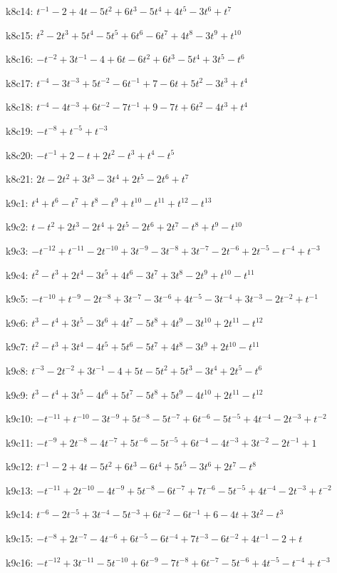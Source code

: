 k8c14: $t^{-1}-2+4t-5t^{2}+6t^{3}-5t^{4}+4t^{5}-3t^{6}+t^{7}$

k8c15: $t^{2}-2t^{3}+5t^{4}-5t^{5}+6t^{6}-6t^{7}+4t^{8}-3t^{9}+t^{10}$

k8c16: $-t^{-2}+3t^{-1}-4+6t-6t^{2}+6t^{3}-5t^{4}+3t^{5}-t^{6}$

k8c17: $t^{-4}-3t^{-3}+5t^{-2}-6t^{-1}+7-6t+5t^{2}-3t^{3}+t^{4}$

k8c18: $t^{-4}-4t^{-3}+6t^{-2}-7t^{-1}+9-7t+6t^{2}-4t^{3}+t^{4}$

k8c19: $-t^{-8}+t^{-5}+t^{-3}$

k8c20: $-t^{-1}+2-t+2t^{2}-t^{3}+t^{4}-t^{5}$

k8c21: $2t-2t^{2}+3t^{3}-3t^{4}+2t^{5}-2t^{6}+t^{7}$

k9c1: $t^{4}+t^{6}-t^{7}+t^{8}-t^{9}+t^{10}-t^{11}+t^{12}-t^{13}$

k9c2: $t-t^{2}+2t^{3}-2t^{4}+2t^{5}-2t^{6}+2t^{7}-t^{8}+t^{9}-t^{10}$

k9c3: $-t^{-12}+t^{-11}-2t^{-10}+3t^{-9}-3t^{-8}+3t^{-7}-2t^{-6}+2t^{-5}-t^{-4}+t^{-3}$

k9c4: $t^{2}-t^{3}+2t^{4}-3t^{5}+4t^{6}-3t^{7}+3t^{8}-2t^{9}+t^{10}-t^{11}$

k9c5: $-t^{-10}+t^{-9}-2t^{-8}+3t^{-7}-3t^{-6}+4t^{-5}-3t^{-4}+3t^{-3}-2t^{-2}+t^{-1}$

k9c6: $t^{3}-t^{4}+3t^{5}-3t^{6}+4t^{7}-5t^{8}+4t^{9}-3t^{10}+2t^{11}-t^{12}$

k9c7: $t^{2}-t^{3}+3t^{4}-4t^{5}+5t^{6}-5t^{7}+4t^{8}-3t^{9}+2t^{10}-t^{11}$

k9c8: $t^{-3}-2t^{-2}+3t^{-1}-4+5t-5t^{2}+5t^{3}-3t^{4}+2t^{5}-t^{6}$

k9c9: $t^{3}-t^{4}+3t^{5}-4t^{6}+5t^{7}-5t^{8}+5t^{9}-4t^{10}+2t^{11}-t^{12}$

k9c10: $-t^{-11}+t^{-10}-3t^{-9}+5t^{-8}-5t^{-7}+6t^{-6}-5t^{-5}+4t^{-4}-2t^{-3}+t^{-2}$

k9c11: $-t^{-9}+2t^{-8}-4t^{-7}+5t^{-6}-5t^{-5}+6t^{-4}-4t^{-3}+3t^{-2}-2t^{-1}+1$

k9c12: $t^{-1}-2+4t-5t^{2}+6t^{3}-6t^{4}+5t^{5}-3t^{6}+2t^{7}-t^{8}$

k9c13: $-t^{-11}+2t^{-10}-4t^{-9}+5t^{-8}-6t^{-7}+7t^{-6}-5t^{-5}+4t^{-4}-2t^{-3}+t^{-2}$

k9c14: $t^{-6}-2t^{-5}+3t^{-4}-5t^{-3}+6t^{-2}-6t^{-1}+6-4t+3t^{2}-t^{3}$

k9c15: $-t^{-8}+2t^{-7}-4t^{-6}+6t^{-5}-6t^{-4}+7t^{-3}-6t^{-2}+4t^{-1}-2+t$

k9c16: $-t^{-12}+3t^{-11}-5t^{-10}+6t^{-9}-7t^{-8}+6t^{-7}-5t^{-6}+4t^{-5}-t^{-4}+t^{-3}$

